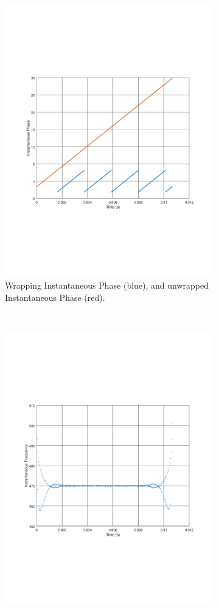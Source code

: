 \begin{figure}
\begin{subfigure}[t]{.5\textwidth}
		\includegraphics[width=.9\linewidth, clip, trim={2cm 7cm 2cm 7cm}]{gfx/Modelling/IFunwrap.pdf}
		\caption{Wrapping Instantaneous Phase (blue), and unwrapped Instantaneous Phase (red).}
		\label{fig:IFsub2}
	\end{subfigure} \\
	\begin{subfigure}[t]{.5\textwidth}
		\centering
		\includegraphics[width=.9\linewidth, clip, trim={2cm 7cm 2cm 7cm}]{gfx/Modelling/IFIF.pdf}

\end{subfigure}
\end{figure}
